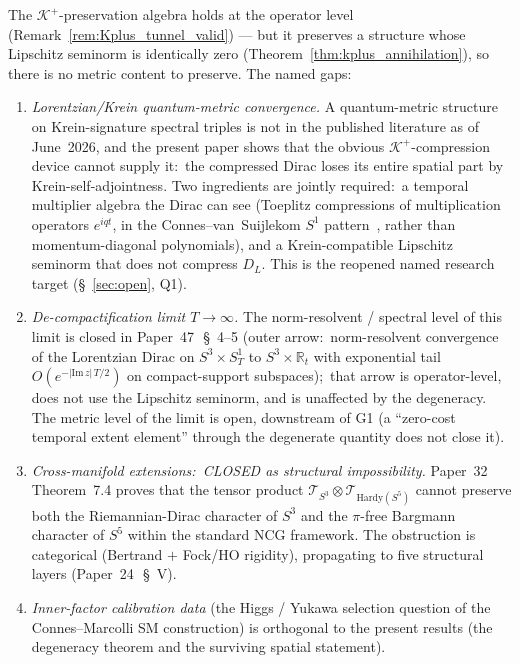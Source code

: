 \documentclass[11pt,a4paper]{article}
\theoremstyle{plain}
\theoremstyle{definition}
\newcommand{\sthree}{S^{3}}
\newcommand{\Sone}{S^{1}}
\newcommand{\SoneT}{S^{1}_{T}}
\newcommand{\Krein}{\mathcal{K}}
\newcommand{\Tcal}{\mathcal{T}}
\newcommand{\R}{\mathbb{R}}
\newcommand{\DL}{D_{L}}
\newcommand{\Kplus}{\Krein^{+}}
\begin{document}
The $\Kplus$-preservation algebra holds at the operator level
(Remark~\ref{rem:Kplus_tunnel_valid}) — but it preserves a structure
whose Lipschitz seminorm is identically zero
(Theorem~\ref{thm:kplus_annihilation}), so there is no metric content
to preserve. The named gaps:
\begin{enumerate}
\item[(G1)] \emph{Lorentzian/Krein quantum-metric convergence.} A
quantum-metric structure on Krein-signature spectral triples is not in
the published literature as of June~2026, and the present paper shows
that the obvious $\Kplus$-compression device cannot supply it:\ the
compressed Dirac loses its entire spatial part by Krein-self-adjointness.
Two ingredients are jointly required:\ a temporal multiplier algebra
the Dirac can see (Toeplitz compressions of multiplication operators
$e^{iqt}$, in the Connes--van~Suijlekom $\Sone$
pattern~\cite{connes_vs2021}, rather than momentum-diagonal
polynomials), and a Krein-compatible Lipschitz seminorm that does not
compress $\DL$. This is the reopened named research target
(\S~\ref{sec:open}, Q1).
\item[(G2)] \emph{De-compactification limit $T \to \infty$.} The
norm-resolvent / spectral level of this limit is closed in
Paper~47~\cite{paper47}\,\S~4--5 (outer arrow:\ norm-resolvent
convergence of the Lorentzian Dirac on $\sthree\times\SoneT$ to
$\sthree\times\R_{t}$ with exponential tail
$O(e^{-|\mathrm{Im}\,z|\,T/2})$ on compact-support subspaces);\ that
arrow is operator-level, does not use the Lipschitz seminorm, and is
unaffected by the degeneracy. The metric level of the limit is open,
downstream of G1 (a ``zero-cost temporal extent element'' through the
degenerate quantity does not close it).
\item[(G3)] \emph{Cross-manifold extensions:\ CLOSED as structural
impossibility.}  Paper~32 Theorem~7.4 proves that the tensor product
$\Tcal_{\sthree} \otimes \Tcal_{\mathrm{Hardy}(S^{5})}$ cannot
preserve both the Riemannian-Dirac character of $S^3$ and the
$\pi$-free Bargmann character of $S^5$ within the standard NCG
framework.  The obstruction is categorical (Bertrand $+$ Fock/HO
rigidity), propagating to five structural layers
(Paper~24~\cite{paper24}\,\S~V).
\item[(G4)] \emph{Inner-factor calibration data} (the Higgs / Yukawa
selection question of the Connes--Marcolli SM construction) is
orthogonal to the present results (the degeneracy theorem and the
surviving spatial statement).
\end{enumerate}
\end{document}

